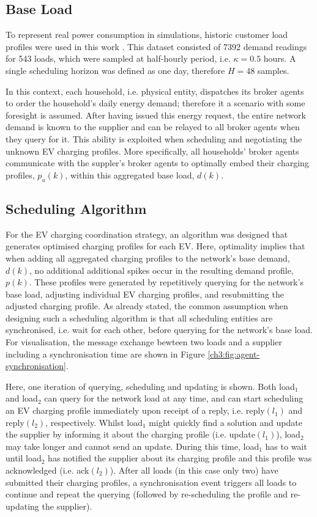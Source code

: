 \subsection{Base Load}

To represent real power consumption in simulations, historic customer load profiles were used in this work \cite{IrishData2002}.
This dataset consisted of 7392 demand readings for 543 loads, which were sampled at half-hourly period, i.e. $\kappa = 0.5$ hours.
A single scheduling horizon was defined as one day, therefore $H=48$ samples.

In this context, each household, i.e. physical entity, dispatches its broker agents to order the household's daily energy demand; therefore it a scenario with some foresight is assumed.
After having issued this energy request, the entire network demand is known to the supplier and can be relayed to all broker agents when they query for it.
This ability is exploited when scheduling and negotiating the unknown EV charging profiles.
More specifically, all households' broker agents communicate with the suppler's broker agents to optimally embed their charging profiles, $p_u(k)$, within this aggregated base load, $d(k)$.

\subsection{Scheduling Algorithm}

For the EV charging coordination strategy, an algorithm was designed that generates optimised charging profiles for each EV.
Here, optimality implies that when adding all aggregated charging profiles to the network's base demand, $d(k)$, no additional additional spikes occur in the resulting demand profile, $p(k)$.
These profiles were generated by repetitively querying for the network's base load, adjusting individual EV charging profiles, and resubmitting the adjusted charging profile.
As already stated, the common assumption when designing such a scheduling algorithm is that all scheduling entities are synchronised, i.e. wait for each other, before querying for the network's base load.
For visualisation, the message exchange bewteen two loads and a supplier including a synchronisation time are shown in Figure \ref{ch3:fig:agent-synchronisation}.



Here, one iteration of querying, scheduling and updating is shown.
Both load$_1$ and load$_2$ can query for the network load at any time, and can start scheduling an EV charging profile immediately upon receipt of a reply, i.e. reply$(l_1)$ and reply$(l_2)$, respectively.
Whilst load$_1$ might quickly find a solution and update the supplier by informing it about the charging profile (i.e. update$(l_1)$), load$_2$ may take longer and cannot send an update.
During this time, load$_1$ has to wait until load$_2$ has notified the supplier about its charging profile and this profile was acknowledged (i.e. ack$(l_2)$).
After all loads (in this case only two) have submitted their charging profiles, a synchronisation event triggers all loads to continue and repeat the querying (followed by re-scheduling the profile and re-updating the supplier).

